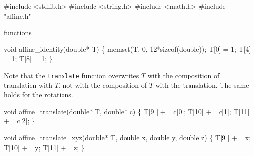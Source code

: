 \nwenddocs{}\endmoddef
#include <stdlib.h>
#include <string.h>
#include <math.h>
#include "affine.h"

\LA{}functions~{\nwtagstyle{}}\RA{}
\nwendcode{}\nwdocspar

\nwenddocs{}\endmoddef
void affine_identity(double* T)
\{
    memset(T, 0, 12*sizeof(double));
    T[0] = 1;
    T[4] = 1;
    T[8] = 1;
\}

\nwendcode{}\nwdocspar

Note that the {\tt{}translate} function overwrites $T$ with
the composition of translation with $T$, not with the
composition of $T$ with the translation.  The same holds
for the rotations.

\nwenddocs{}\plusendmoddef
void affine_translate(double* T, double* c)
\{
    T[9 ] += c[0];
    T[10] += c[1];
    T[11] += c[2];
\}

\nwendcode{}\nwdocspar

\nwenddocs{}\plusendmoddef
void affine_translate_xyz(double* T, double x, double y, double z)
\{
    T[9 ] += x;
    T[10] += y;
    T[11] += z;
\}

\nwendcode{}\nwdocspar


